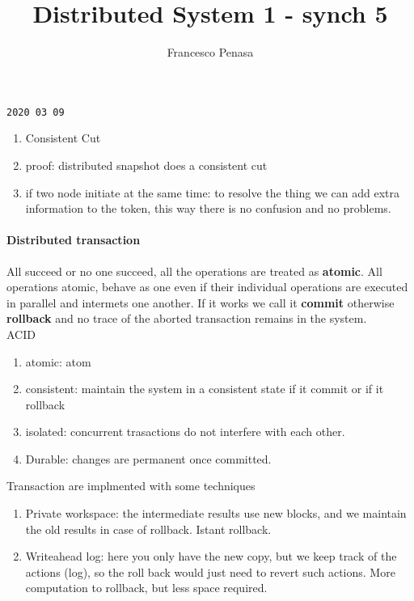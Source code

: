 \documentclass[11pt]{article}
\begin{document}
\author{Francesco Penasa}
\title{Distributed System 1 - synch 5}
\maketitle

\medskip

\texttt{2020 03 09}
\begin{enumerate}
	\item Consistent Cut
	\item proof: distributed snapshot does a consistent cut
	\item if two node initiate at the same time: to resolve the thing we can add extra information to the token, this way there is no confusion and no problems.
\end{enumerate}

\paragraph{Distributed transaction} %
\label{par:distributed_transaction}
All succeed or no one succeed, all the operations are treated as \textbf{atomic}.
All operations atomic, behave as one even if their individual operations are executed in parallel and intermets one another.
If it works we call it \textbf{commit} otherwise \textbf{rollback} and no trace of the aborted transaction remains in the system.\\
ACID
\begin{enumerate}
	\item atomic: atom
	\item consistent: maintain the system in a consistent state if it commit or if it rollback
	\item isolated: concurrent trasactions do not interfere with each other.
	\item Durable: changes are permanent once committed.
\end{enumerate}
Transaction are implmented with some techniques
\begin{enumerate}
	\item Private workspace: the intermediate results use new blocks, and we maintain the old results in case of rollback. Istant rollback.
	\item Writeahead log: here you only have the new copy, but we keep track of the actions (log), so the roll back would just need to revert such actions. More computation to rollback, but less space required.
\end{enumerate}
\end{document}

